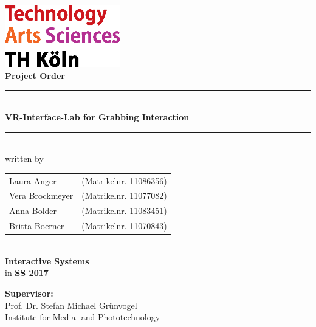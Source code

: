 \thispagestyle{empty}
\begin{center}
	\includegraphics[width=5cm]{Bilder/logo_TH}\\[12ex]
	{\Huge\textbf{Project Order}}\\[8ex]
	\rule{.8\textwidth}{.2pt}
	{\Large\\[1ex] \textbf{VR-Interface-Lab for Grabbing Interaction}}\\
	\rule{.8\textwidth}{.2pt}\\[10ex]
	written by\\[2ex]
	\begin{tabular}{ll}
		Laura Anger &(Matrikelnr. 11086356)\\ 
		Vera Brockmeyer &(Matrikelnr. 11077082)\\
		Anna Bolder &(Matrikelnr. 11083451)\\
		Britta Boerner &(Matrikelnr. 11070843)\\
	\end{tabular}\\[10ex]
	\textbf{Interactive Systems}\\
	in \textbf{SS 2017}\\			
\end{center}
\vfill
\begin{flushleft}
	{\bf Supervisor:}\\
	Prof. Dr. Stefan Michael Grünvogel\\
	Institute for Media- and Phototechnology
\end{flushleft}
\newpage
